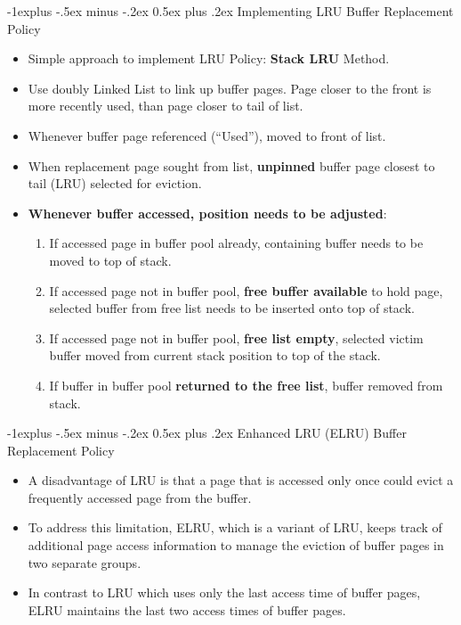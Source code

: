 \documentclass[10pt, landscape]{article}
\makeatletter
\renewcommand{\subsection}{\@startsection{subsection}{2}{0mm}%
                                {-1explus -.5ex minus -.2ex}%
                                {0.5ex plus .2ex}%
                                {\normalfont\normalsize\bfseries}}
\makeatother
\begin{document}
\begin{multicols*}{3}
\columnbreak

\subsection{Implementing LRU Buffer Replacement Policy}
\begin{itemize}
\item Simple approach to implement LRU Policy: \textbf{Stack LRU} Method.
\item Use doubly Linked List to link up buffer pages. Page closer to the front is more recently used, than page closer to tail of list.
\item Whenever buffer page referenced (``Used''), moved to front of list. 
\item When replacement page sought from list, \textbf{unpinned} buffer page closest to tail (LRU) selected for eviction.
\item \textbf{Whenever buffer accessed, position needs to be adjusted}:
\begin{enumerate}
\item If accessed page in buffer pool already, containing buffer needs to be moved to top of stack.
\item If accessed page not in buffer pool, \textbf{free buffer available} to hold page, selected buffer from free list needs to be inserted onto top of stack.
\item If accessed page not in buffer pool, \textbf{free list empty}, selected victim buffer moved from current stack position to top of the stack.
\item If buffer in buffer pool \textbf{returned to the free list}, buffer removed from stack.
\end{enumerate}
\end{itemize}

\subsection{Enhanced LRU (ELRU) Buffer Replacement Policy}
\begin{itemize}
\item A disadvantage of LRU is that a page that is accessed only once could evict a frequently accessed page from the buffer.
\item To address this limitation, ELRU, which is a variant of LRU, keeps track of additional page access information to manage the eviction of buffer pages in two separate groups.
\item In contrast to LRU which uses only the last access time of buffer pages, ELRU maintains the last two access times of buffer pages.
\end{itemize}


\end{multicols*}
\end{document}
